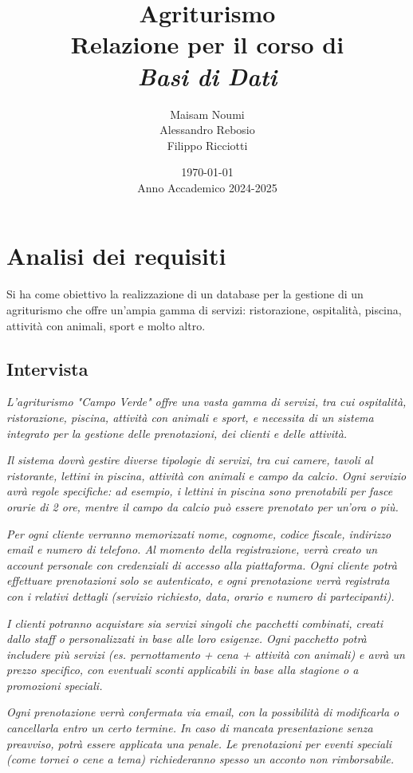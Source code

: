 \documentclass[a4paper,12pt]{report}
\title{
    \vspace*{2cm}
    \Huge\textbf{Agriturismo} \\[0.5cm]
    \LARGE Relazione per il corso di \\[0.2cm]
    \textit{Basi di Dati} \\[2cm]
}
\author{
    \Large
    Maisam Noumi \\
    Alessandro Rebosio \\
    Filippo Ricciotti
}
\date{
    \vspace{1cm}
    \today \\[0.5cm]
    Anno Accademico 2024-2025
}
\begin{document}
\maketitle

\tableofcontents

\chapter{Analisi dei requisiti}
Si ha come obiettivo la realizzazione di un database per la gestione di un agriturismo che offre un'ampia gamma di servizi: ristorazione,
ospitalità, piscina, attività con animali, sport e molto altro.

\section{Intervista}
\textit{L'agriturismo "Campo Verde" offre una vasta gamma di servizi, tra cui ospitalità, ristorazione, piscina, attività con animali
	e sport, e necessita di un sistema integrato per la gestione delle prenotazioni, dei clienti e delle attività.}

\textit{Il sistema dovrà gestire diverse tipologie di servizi, tra cui camere, tavoli al ristorante, lettini in piscina, attività
	con animali e campo da calcio. Ogni servizio avrà regole specifiche: ad esempio, i lettini in piscina sono prenotabili per fasce orarie
	di 2 ore, mentre il campo da calcio può essere prenotato per un'ora o più.}

\textit{Per ogni cliente verranno memorizzati nome, cognome, codice fiscale, indirizzo email e numero di telefono. Al momento della
	registrazione, verrà creato un account personale con credenziali di accesso alla piattaforma. Ogni cliente potrà effettuare prenotazioni
	solo se autenticato, e ogni prenotazione verrà registrata con i relativi dettagli (servizio richiesto, data, orario e numero di partecipanti).}

\textit{I clienti potranno acquistare sia servizi singoli che pacchetti combinati, creati dallo staff o personalizzati in base alle
	loro esigenze. Ogni pacchetto potrà includere più servizi (es. pernottamento + cena + attività con animali) e avrà un prezzo
	specifico, con eventuali sconti applicabili in base alla stagione o a promozioni speciali.}

\textit{Ogni prenotazione verrà confermata via email, con la possibilità di modificarla o cancellarla entro un certo termine. In
	caso di mancata presentazione senza preavviso, potrà essere applicata una penale. Le prenotazioni per eventi speciali (come tornei o cene a tema)
	richiederanno spesso un acconto non rimborsabile.}
\end{document}
